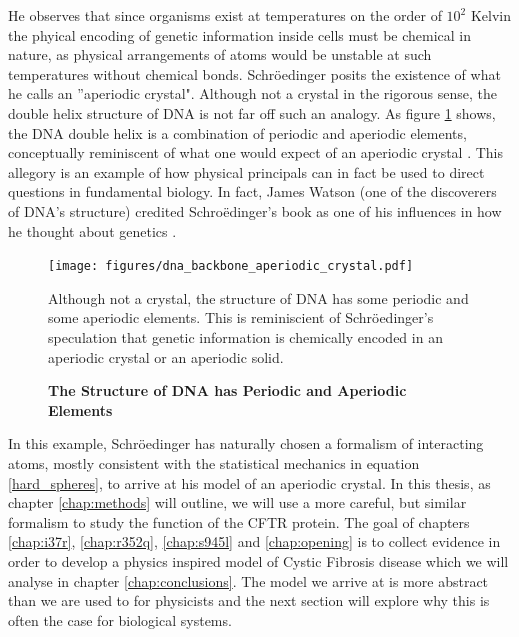 He observes that since organisms exist at temperatures on the order of $10^2 $ Kelvin the phyical encoding of genetic information inside cells must be chemical in nature, as physical arrangements of atoms would be unstable at such temperatures without chemical bonds. Schr\"oedinger posits the existence of what he calls an ''aperiodic crystal". Although not a crystal in the rigorous sense, the double helix structure of DNA is not far off such an analogy. As figure \ref{dna_structure} shows, the DNA double helix is a combination of periodic and aperiodic elements, conceptually reminiscent of what one would expect of an aperiodic crystal \cite{varn2016}. This allegory is an example of how physical principals can in fact be used to direct questions in fundamental biology. In fact, James Watson (one of the discoverers of DNA's structure) credited Schro\"edinger's book as one of his influences in how he thought about genetics \cite{watson2010}.

\begin{figure}
	\begin{center}
		\texttt{[image: figures/dna\_backbone\_aperiodic\_crystal.pdf]}
	\end{center}
	\captionsetup{singlelinecheck = false, justification=raggedright}
	\caption[The Structure of DNA has Periodic and Aperiodic Elements] {\textbf{The Structure of DNA has Periodic and Aperiodic Elements}}{Although not a crystal, the structure of DNA has some periodic and some aperiodic elements. This is reminiscient of Schr\"oedinger's speculation that genetic information is chemically encoded in an aperiodic crystal or an aperiodic solid. }
	\label{dna_structure}
\end{figure}

In this example, Schr\"oedinger has naturally chosen a formalism of interacting atoms, mostly consistent with the statistical mechanics in equation \ref{hard_spheres}, to arrive at his model of an aperiodic crystal. In this thesis, as chapter \ref{chap:methods} will outline, we will use a more careful, but similar formalism to study the function of the CFTR protein. The goal of chapters \ref{chap:i37r}, \ref{chap:r352q}, \ref{chap:s945l} and \ref{chap:opening} is to collect evidence in order to develop a physics inspired model of Cystic Fibrosis disease which we will analyse in chapter \ref{chap:conclusions}. The model we arrive at is more abstract than we are used to for physicists and the next section will explore why this is often the case for biological systems.
 
